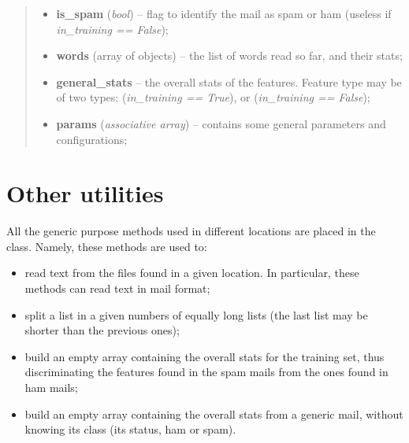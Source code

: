 \documentclass[letterpaper,10pt,english]{sphinxmanual}
\begin{document}
\begin{fulllineitems}
\begin{fulllineitems}
\begin{quote}
\begin{description}
\begin{itemize}
\item {} 
\textbf{is\_spam} (\emph{bool}) -- flag to identify the mail as spam or ham (useless if             \emph{in\_training == False});

\item {} 
\textbf{words} (array of {\hyperref[index:gen_stat.Word]{}} objects) -- the list of words read so far, and their stats;

\item {} 
\textbf{general\_stats} -- the overall stats of the features. Feature type may be            of two types:                {\hyperref[index:gen_stat.Stat]{}} (\emph{in\_training == True}), or                {\hyperref[index:test_stat.Test_stat]{}} (\emph{in\_training == False});

\item {} 
\textbf{params} (\emph{associative array}) -- contains some general parameters and configurations;

\end{itemize}

\end{description}\end{quote}

\end{fulllineitems}


\end{fulllineitems}



\section{Other utilities}
\label{index:other-utilities}
All the generic purpose methods used in different locations are placed in the {\hyperref[index:utils.Utils]{}} class. Namely, these methods are used to:
\begin{itemize}
\item {} 
read text from the files found in a given location. In particular, these methods can read text in mail format;

\item {} 
split a list in a given numbers of equally long lists (the last list may be shorter than the previous ones);

\item {} 
build an empty array containing the overall stats for the training set, thus discriminating the features found in the spam mails from the ones found in ham mails;

\item {} 
build an empty array containing the overall stats from a generic mail, without knowing its class (its status, ham or spam).

\end{itemize}
\end{document}
